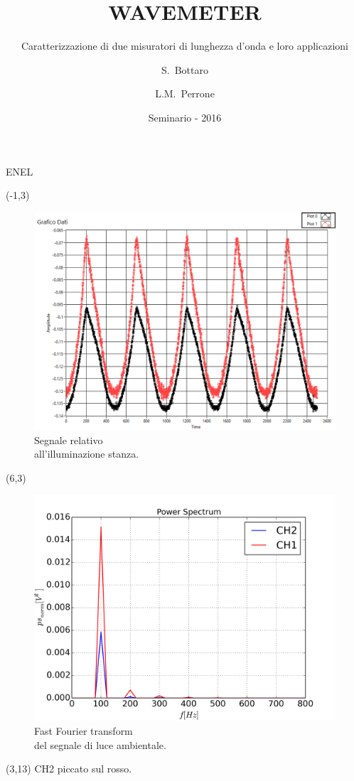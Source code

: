 \documentclass{beamer}
\title{WAVEMETER}
\subtitle{Caratterizzazione di due misuratori di lunghezza d'onda e loro applicazioni}
\author{S.~Bottaro\inst{1} \and L.M.~Perrone\inst{1}}
\institute[Unipi] %
{
  \inst{1}%
  Dipartimento di Fisica\\
  Università di Pisa
  }
\date{Seminario - 2016}
\begin{document}
\begin{frame}{ENEL}

\begin{textblock}{12}(-1,3)
\begin{figure}
\includegraphics[width=0.5\linewidth]{./luce_stanza_enel}
\caption{Segnale relativo\\
all'illuminazione stanza.}
\label{fig:enel}
\end{figure}
\end{textblock}

\begin{textblock}{12}(6,3)
\begin{figure}
\centering
\includegraphics[width=0.5\linewidth]{./fft_lucestanza}
\caption{Fast Fourier transform \\
del segnale di luce ambientale.}
\label{fig:fft_lucestanza}
\end{figure}
\end{textblock}

\begin{textblock}{10}(3,13)
CH2 piccato sul rosso.
\end{textblock}
\end{frame}
\end{document}
